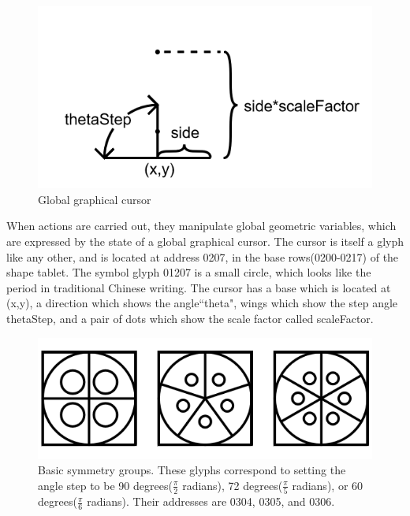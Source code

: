 \documentclass[11pt]{article}
\begin{document}
\begin{figure}
\includegraphics{figures/figure7_globalCursor.png}
\caption{Global graphical cursor}
\end{figure}




    When actions are carried out, they manipulate global geometric variables, which are expressed by the state of a global graphical cursor.  The cursor is itself a glyph like any other, and is located at address 0207, in the base rows(0200-0217) of the shape tablet.  The symbol glyph 01207 is a small circle, which looks like the period in traditional Chinese writing.  The cursor has a base which is located at (x,y), a direction which shows the angle``theta", wings which show the step angle thetaStep, and a pair of dots which show the scale factor called scaleFactor.  




\begin{figure}
\includegraphics{figures/figure8_symmetries.png}
\caption{Basic symmetry groups.  These glyphs correspond to setting the angle step to be 90 degrees($\frac{\pi}{2}$ radians), 72 degrees($\frac{\pi}{5}$ radians), or 60 degrees($\frac{\pi}{6}$ radians). Their addresses are 0304, 0305, and 0306. }
\end{figure}
\end{document}
